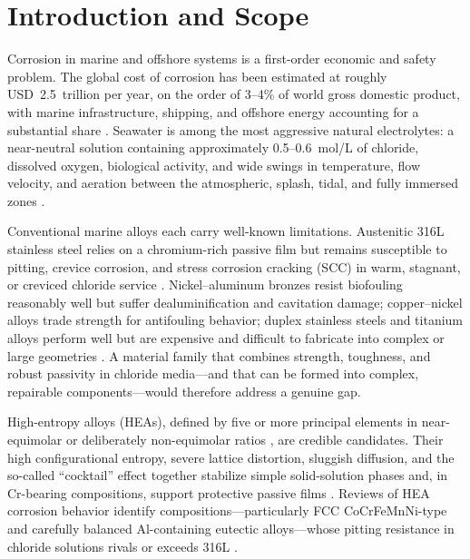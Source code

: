 \section{Introduction and Scope}
\label{sec:intro}

Corrosion in marine and offshore systems is a first-order economic and safety problem. The global cost of corrosion has been estimated at roughly USD~2.5~trillion per year, on the order of 3--4\% of world gross domestic product, with marine infrastructure, shipping, and offshore energy accounting for a substantial share \cite{koch2016}. Seawater is among the most aggressive natural electrolytes: a near-neutral solution containing approximately 0.5--0.6~mol/L of chloride, dissolved oxygen, biological activity, and wide swings in temperature, flow velocity, and aeration between the atmospheric, splash, tidal, and fully immersed zones \cite{nass2025marine}.

Conventional marine alloys each carry well-known limitations. Austenitic 316L stainless steel relies on a chromium-rich passive film but remains susceptible to pitting, crevice corrosion, and stress corrosion cracking (SCC) in warm, stagnant, or creviced chloride service \cite{lpbf_316l_scc2022}. Nickel--aluminum bronzes resist biofouling reasonably well but suffer dealuminification and cavitation damage; copper--nickel alloys trade strength for antifouling behavior; duplex stainless steels and titanium alloys perform well but are expensive and difficult to fabricate into complex or large geometries \cite{nass2025marine}. A material family that combines strength, toughness, and robust passivity in chloride media---and that can be formed into complex, repairable components---would therefore address a genuine gap.

High-entropy alloys (HEAs), defined by five or more principal elements in near-equimolar or deliberately non-equimolar ratios \cite{yeh2004,cantor2004}, are credible candidates. Their high configurational entropy, severe lattice distortion, sluggish diffusion, and the so-called ``cocktail'' effect together stabilize simple solid-solution phases and, in Cr-bearing compositions, support protective passive films \cite{miracle2017,george2019,murty2019}. Reviews of HEA corrosion behavior identify compositions---particularly FCC CoCrFeMnNi-type and carefully balanced Al-containing eutectic alloys---whose pitting resistance in chloride solutions rivals or exceeds 316L \cite{qiu2017,qiu2019}.

